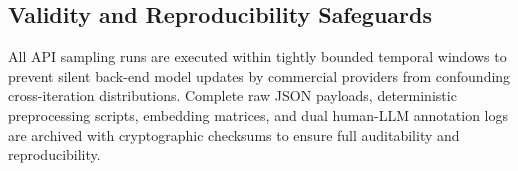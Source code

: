 \subsection{Validity and Reproducibility Safeguards}
All API sampling runs are executed within tightly bounded temporal windows to prevent silent back-end model updates by commercial providers from confounding cross-iteration distributions. Complete raw JSON payloads, deterministic preprocessing scripts, embedding matrices, and dual human-LLM annotation logs are archived with cryptographic checksums to ensure full auditability and reproducibility.